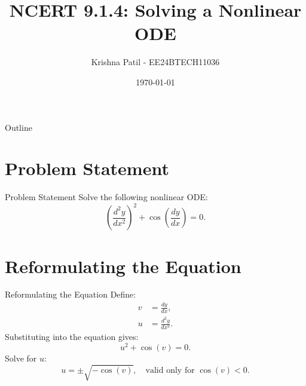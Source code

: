 \documentclass{beamer}
\title{NCERT 9.1.4: Solving a Nonlinear ODE}
\author{Krishna Patil - EE24BTECH11036}
\date{\today}
\begin{document}
\begin{frame}
    \titlepage
\end{frame}

\begin{frame}{Outline}
    \tableofcontents
\end{frame}

\section{Problem Statement}
\begin{frame}{Problem Statement}
    Solve the following nonlinear ODE:
    \begin{equation*}
        \left(\frac{d^2y}{dx^2}\right)^2 + \cos\left(\frac{dy}{dx}\right) = 0.
    \end{equation*}
\end{frame}

\section{Reformulating the Equation}
\begin{frame}{Reformulating the Equation}
    Define:
    \begin{align*}
        v &= \frac{dy}{dx}, \\
        u &= \frac{d^2y}{dx^2}.
    \end{align*}
    Substituting into the equation gives:
    \begin{equation*}
        u^2 + \cos(v) = 0.
    \end{equation*}
    \vspace{0.5cm}
    Solve for $u$:
    \begin{equation*}
        u = \pm \sqrt{-\cos(v)}, \quad \text{valid only for } \cos(v) < 0.
    \end{equation*}
\end{frame}

\end{document}
